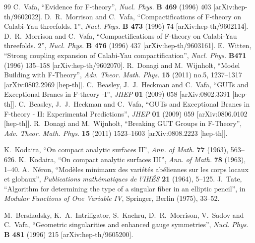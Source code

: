 \documentclass[12pt]{article}
\begin{document}
\begin{thebibliography}{99}
C.~Vafa, ``Evidence for F-theory'', {\it Nucl. Phys.} {\bf B 469} (1996) 403 [arXiv:hep-th/9602022].
D.~R.~Morrison and C.~Vafa, ``Compactifications of F-theory on Calabi-Yau threefolds. 1'', {\it Nucl. Phys.} {\bf B 473} (1996) 74 [arXiv:hep-th/9602114].
D.~R.~Morrison and C.~Vafa, ``Compactifications of F-theory on Calabi-Yau threefolds. 2'', {\it Nucl. Phys.} {\bf B 476} (1996) 437 [arXiv:hep-th/9603161].
E.~Witten, ``Strong coupling expansion of Calabi-Yau compactification'', {\it Nucl. Phys.} {\bf B471} (1996) 135--158 [arXiv:hep-th/9602070].
R.~Donagi and M.~Wijnholt, ``Model Building with F-Theory'', {\it Adv. Theor. Math. Phys.} {\bf 15} (2011) no.5, 1237--1317 [arXiv:0802.2969 [hep-th]].
C.~Beasley, J.~J.~Heckman and C.~Vafa, ``GUTs and Exceptional Branes in  F-theory -I'', {\it JHEP} {\bf 01} (2009) 058 [arXiv:0802.3391 [hep-th]].
C.~Beasley, J.~J.~Heckman and C.~Vafa, ``GUTs and Exceptional Branes in F-theory - II: Experimental Predictions'', {\it JHEP} {\bf 01} (2009) 059 [arXiv:0806.0102 [hep-th]].
R.~Donagi and M.~Wijnholt, ``Breaking GUT Groups in F-Theory'', {\it Adv. Theor. Math. Phys.} {\bf 15} (2011) 1523--1603 [arXiv:0808.2223 [hep-th]].

K.~Kodaira, ``On compact analytic surfaces II'', {\it Ann. of Math.} {\bf 77} (1963), 563--626.
K.~Kodaira, ``On compact analytic surfaces III'', {\it Ann. of Math.} {\bf 78} (1963), 1--40.
A.~N\'eron, ``Mod\`eles minimaux des vari\'et\'es ab\'eliennes sur les corps locaux et globaux'', {\it Publications math{\' e}matiques de l'IH{\' E}S} {\bf 21} (1964), 5--125.
J.~Tate, ``Algorithm for determining the type of a singular fiber in an elliptic pencil'', in {\it Modular Functions of One Variable IV}, Springer, Berlin (1975), 33--52.

M.~Bershadsky, K.~A.~Intriligator, S.~Kachru, D.~R.~Morrison, V.~Sadov and C.~Vafa, ``Geometric singularities and enhanced gauge symmetries'', {\it Nucl. Phys.} {\bf B 481} (1996) 215 [arXiv:hep-th/9605200].


\end{thebibliography}
\end{document}
